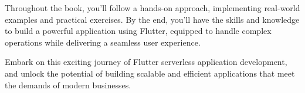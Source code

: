 Throughout the book, you'll follow a hands-on approach, implementing real-world examples and practical exercises. 
By the end, you'll have the skills and knowledge to build a powerful application using Flutter, equipped to 
handle complex operations while delivering a seamless user experience.

Embark on this exciting journey of Flutter serverless application development, and unlock the potential of 
building scalable and efficient applications that meet the demands of modern businesses.
